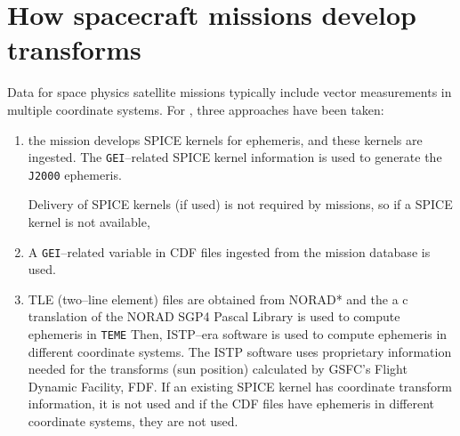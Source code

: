 \documentclass[draft]{agujournal2019}
\begin{document}
\section{How spacecraft missions develop transforms}
\label{sect:missions}

Data for space physics satellite missions typically include vector measurements in multiple coordinate systems. For , three approaches have been taken:

\begin{enumerate}
    \parskip 0.1in 

    \item the mission develops SPICE kernels for ephemeris, and these kernels are ingested. The \texttt{GEI}--related SPICE kernel information is used to generate the \texttt{J2000} ephemeris.

    Delivery of SPICE kernels (if used) is not required by missions, so if a SPICE kernel is not available,

    \item A \texttt{GEI}--related variable in CDF files ingested from the mission database is used.

    \item TLE (two--line element) files are obtained from NORAD* and the a c translation of the NORAD SGP4 Pascal Library \cite{NORADSGP4c} is used to compute ephemeris in \texttt{TEME} Then, ISTP--era software is used to compute ephemeris in different coordinate systems. The ISTP software uses proprietary information needed for the transforms (sun position) calculated by GSFC's Flight Dynamic Facility, FDF. If an existing SPICE kernel has coordinate transform information, it is not used and if the CDF files have ephemeris in different coordinate systems, they are not used.

\end{enumerate}
\end{document}
